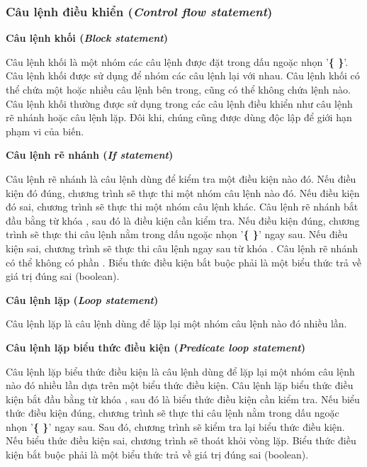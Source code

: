\subsubsection{Câu lệnh điều khiển (\textit{Control flow statement})}

\noindent\textbf{\label{ch2:block_stmt}Câu lệnh khối (\textit{Block statement})}

\regexblockstmt

Câu lệnh khối là một nhóm các câu lệnh được đặt trong dấu ngoặc nhọn '\textbf{\{ \}}'. Câu lệnh khối được sử dụng để nhóm các câu lệnh lại với nhau. Câu lệnh khối có thể chứa một hoặc nhiều câu lệnh bên trong, cũng có thể không chứa lệnh nào. Câu lệnh khối thường được sử dụng trong các câu lệnh điều khiển như câu lệnh rẽ nhánh hoặc câu lệnh lặp. Đôi khi, chúng cũng được dùng độc lập để giới hạn phạm vi của biến.

\noindent\textbf{\label{ch2:if_stmt}Câu lệnh rẽ nhánh (\textit{If statement})}

\regexifstmt

Câu lệnh rẽ nhánh là câu lệnh dùng để kiểm tra một điều kiện nào đó. Nếu điều kiện đó đúng, chương trình sẽ thực thi một nhóm câu lệnh nào đó. Nếu điều kiện đó sai, chương trình sẽ thực thi một nhóm câu lệnh khác. Câu lệnh rẽ nhánh bắt đầu bằng từ khóa , sau đó là điều kiện cần kiểm tra. Nếu điều kiện đúng, chương trình sẽ thực thi câu lệnh nằm trong dấu ngoặc nhọn '\textbf{\{ \}}' ngay sau. Nếu điều kiện sai, chương trình sẽ thực thi câu lệnh ngay sau từ khóa . Câu lệnh rẽ nhánh có thể không có phần . Biểu thức điều kiện bắt buộc phải là một biểu thức trả về giá trị đúng sai (boolean).

\noindent\textbf{Câu lệnh lặp (\textit{Loop statement})}

\regexloopstmt

Câu lệnh lặp là câu lệnh dùng để lặp lại một nhóm câu lệnh nào đó nhiều lần.

\noindent\textbf{\label{ch2:while_stmt}Câu lệnh lặp biểu thức điều kiện (\textit{Predicate loop statement})}

\regexpredloopstmt

Câu lệnh lặp biểu thức điều kiện là câu lệnh dùng để lặp lại một nhóm câu lệnh nào đó nhiều lần dựa trên một biểu thức điều kiện. Câu lệnh lặp biểu thức điều kiện bắt đầu bằng từ khóa , sau đó là biểu thức điều kiện cần kiểm tra. Nếu biểu thức điều kiện đúng, chương trình sẽ thực thi câu lệnh nằm trong dấu ngoặc nhọn '\textbf{\{ \}}' ngay sau. Sau đó, chương trình sẽ kiểm tra lại biểu thức điều kiện. Nếu biểu thức điều kiện sai, chương trình sẽ thoát khỏi vòng lặp. Biểu thức điều kiện bắt buộc phải là một biểu thức trả về giá trị đúng sai (boolean).

